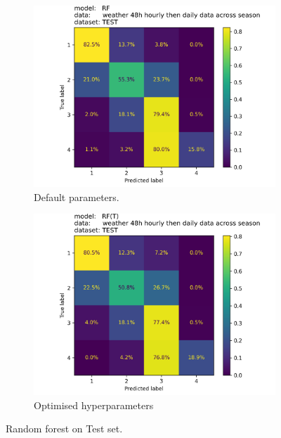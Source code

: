 \documentclass{article}
\begin{document}
	\begin{figure}[h]
		\centering
		\begin{subfigure}[b]{0.49\textwidth}
			\includegraphics[width=\textwidth]{sais_confusion_matrix_RF_____weather_48h_hourly_then_daily_data_across_season_test.png}
			\caption{Default parameters.}
		\end{subfigure}
		\hfill
		\begin{subfigure}[b]{0.49\textwidth}
			\includegraphics[width=\textwidth]{sais_confusion_matrix_RF(T)__weather_48h_hourly_then_daily_data_across_season_test.png}
			\caption{Optimised hyperparameters}

		\end{subfigure}
		\caption{Random forest on Test set.}
		\label{fig:rf}
	\end{figure}
\end{document}
